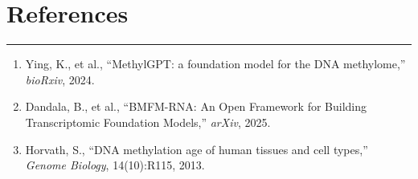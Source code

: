 \documentclass[11pt]{article}
\begin{document}
\section*{References}
\vspace{-0.3em}
\hrule
\vspace{0.8em}
\begin{enumerate}[leftmargin=1.5em]
\item Ying, K., et al., ``MethylGPT: a foundation model for the DNA methylome,'' \emph{bioRxiv}, 2024.
\item Dandala, B., et al., ``BMFM-RNA: An Open Framework for Building Transcriptomic Foundation Models,'' \emph{arXiv}, 2025.
\item Horvath, S., ``DNA methylation age of human tissues and cell types,'' \emph{Genome Biology}, 14(10):R115, 2013.
\end{enumerate}
\end{document}
